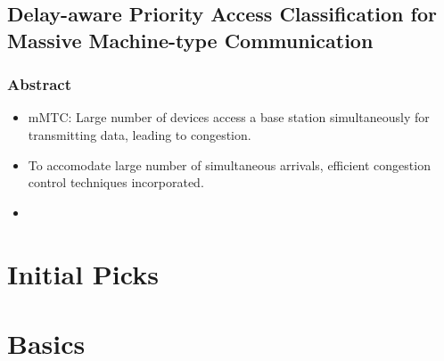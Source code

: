 \documentclass[11pt]{article}
\begin{document}
\subsection{Delay-aware Priority Access Classification for Massive Machine-type Communication}
\label{sec:org4278c66}
\subsubsection{Abstract}
\label{sec:orgc949bfa}
\begin{itemize}
\item mMTC: Large number of devices access a base station simultaneously for transmitting data, leading to congestion.
\item To accomodate large number of simultaneous arrivals, efficient congestion control techniques incorporated.
\item 
\end{itemize}
\section{Initial Picks}
\label{sec:orgaca118b}
\section{Basics}
\label{sec:orgceca03c}
\end{document}
